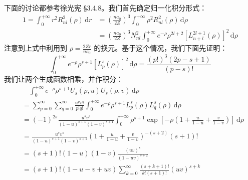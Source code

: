 下面的讨论都参考徐光宪 \S 3.4.8。我们首先确定归一化积分形式：
\begin{align}
1 = \int_0^{+\infty} r^2 R_{nl}^2 (\rho) \, \mathrm{d} r
&= \left( \frac{n a_0}{2 Z} \right)^3 \int_0^{+\infty} \rho^2 R_{nl}^2 (\rho) \, \mathrm{d} \rho \\
&= \left( \frac{n a_0}{2 Z} \right)^3 N_{nl}^2 \int_0^{+\infty} e^{-\rho} \rho^{2 l + 2} [L_{n + l}^{2 l + 1} (\rho)]^2 \, \mathrm{d} \rho
\end{align}
注意到上式中利用到 $\rho = \frac{2 Z r}{n a_0}$ 的换元。基于这个情况，我们下面先证明：
\begin{equation}
\int_0^{+\infty} e^{-\rho} \rho^{s+1} [L_p^s(\rho)]^2 \, \mathrm{d} \rho = \frac{(p!)^3 (2 p - s + 1)}{(p - s)!}
\end{equation}
我们让两个生成函数相乘，并作积分：
\begin{align}
&\quad \int_0^{+\infty} e^{-\rho} \rho^{s+1} U_s(\rho, u) U_s(\rho, v) \, \mathrm{d} \rho \\
&= \sum_{p = 0}^\infty \sum_{q = 0}^\infty \frac{u^p v^q}{p! q!} \int_0^{+\infty} e^{- \rho} \rho^{s+1} L_p^s (\rho) L_q^s (\rho) \, \mathrm{d} \rho \\
&= (-1)^{2s} \frac{u^s v^s}{(1-u)^{s+1} (1-v)^{s+1}} \int_0^{+\infty} \rho^{s+1} \exp \left[ - \rho \left( 1 + \frac{u}{1-u} + \frac{v}{1-v} \right) \right] \, \mathrm{d} \rho \\
&= \frac{u^s v^s}{(1-u)^{s+1} (1-v)^{s+1}} \left( 1 + \frac{u}{1-u} + \frac{v}{1-v} \right)^{-(s+2)} (s+1)! \\
&= (s+1)! (1-u) (1-v) \frac{(uv)^s}{(1-uv)^{s+2}} \\
&= (s+1)! (1-u-v+uv) \sum_{k=0}^\infty \frac{(s+k+1)!}{k!(s+1)!} (uv)^{s+k}
\end{align}
